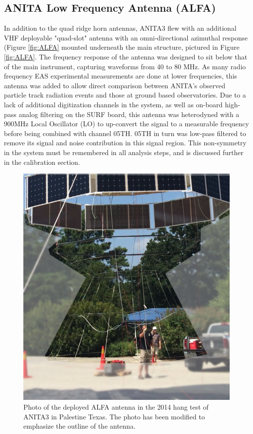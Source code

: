 	
	
	\subsection{ANITA Low Frequency Antenna (ALFA)}
		In addition to the quad ridge horn antennas, ANITA3 flew with an additional VHF deployable "quad-slot" antenna with an omni-directional azimuthal response (Figure \ref{fig:ALFA} mounted underneath the main structure, pictured in Figure \ref{fig:ALFA}.  The frequency response of the antenna was designed to sit below that of the main instrument, capturing waveforms from 40 to 80 MHz.  As many radio frequency EAS experimental measurements are done at lower frequencies, this antenna was added to allow direct comparison between ANITA's observed particle track radiation events and those at ground based observatories.  Due to a lack of additional digitization channels in the system, as well as on-board high-pass analog filtering on the SURF board, this antenna was heterodyned with a 900MHz Local Oscillator (LO) to up-convert the signal to a measurable frequency before being combined with channel 05TH.  05TH in turn was low-pass filtered to remove its signal and noise contribution in this signal region.  This non-symmetry in the system must be remembered in all analysis steps, and is discussed further in the calibration section.
		
\begin{figure}
\centering
	\includegraphics[width=\textwidth]{figures/ALFA_pic}
	\caption{Photo of the deployed ALFA antenna in the 2014 hang test of ANITA3 in Palestine Texas.  The photo has been modified to emphasize the outline of the antenna.}
	\label{fig:ALFA_pic}
\end{figure}


